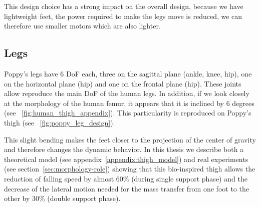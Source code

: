 This design choice has a strong impact on the overall design, because we have lightweight feet, the power required to make the legs move is reduced, we can therefore use smaller motors which are also lighter.






\subsection{Legs} %
\label{sub:poppy-leg-design}

Poppy's legs have 6 DoF each, three on the sagittal plane (ankle, knee, hip), one on the horizontal plane (hip) and one on the frontal plane (hip). These joints allow reproduce the main DoF of the human legs. In addition, if we look closely at the morphology of the human femur, it appears that it is inclined by 6 degrees (see \figurename~\ref{fig:human_thigh_appendix}). This particularity is reproduced on Poppy's thigh (see \figurename~\ref{fig:poppy_leg_design}).



This slight bending makes the feet closer to the projection of the center of gravity and therefore changes the dynamic behavior.
In this thesis we describe both a theoretical model (see appendix~\ref{appendix:thigh_model}) and real experiments (see section~\ref{sec:morphology-role}) showing that this bio-inspired thigh allows the reduction of falling speed by almost 60\% (during single support phase) and the decrease of the lateral motion needed for the mass transfer from one foot to the other by 30\% (double support phase).


